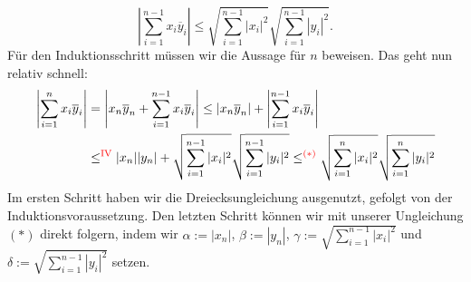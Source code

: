 \begin{beweis}
\begin{equation}
\left| \sum_{i=1}^{n-1} x_i \overline{y}_i\right| \leq \sqrt{\sum_{i=1}^{n-1} |x_i|^2} \sqrt{\sum_{i=1}^{n-1} |y_i|^2}.
\end{equation}
Für den Induktionsschritt müssen wir die Aussage für $n$ beweisen. Das geht nun relativ schnell:
\begin{align*}
\left| \sum_{i=1}^n x_i \overline{y}_i\right| &= \left| x_n \overline{y}_n + \sum_{i=1}^{n-1} x_i \overline{y}_i\right|\leq |x_n \overline{y}_n| + \left| \sum_{i=1}^{n-1} x_i \overline{y}_i\right|\\
&\leq^\text{\textcolor{red}{IV}} |x_n| |y_n| + \sqrt{\sum_{i=1}^{n-1} |x_i|^2} \sqrt{\sum_{i=1}^{n-1} |y_i|^2} \leq^{\textcolor{red}{(\ast)}} \sqrt{\sum_{i=1}^{n} |x_i|^2} \sqrt{\sum_{i=1}^{n} |y_i|^2}
\end{align*}
Im ersten Schritt haben wir die Dreiecksungleichung ausgenutzt, gefolgt von der Induktionsvoraussetzung. Den letzten Schritt können wir mit unserer Ungleichung $(\ast)$ direkt folgern, indem wir $\alpha:=|x_n|$, $\beta:= |y_n|$, $\gamma:= \sqrt{\sum_{i=1}^{n-1} |x_i|^2}$ und $\delta :=\sqrt{\sum_{i=1}^{n-1} |y_i|^2}$ setzen.
\end{beweis}